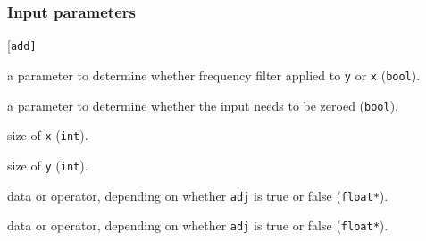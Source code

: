 \subsubsection*{Input parameters}
\begin{desclist}{\tt }{\quad}[\tt add]
   \setlength\itemsep{0pt}
   \item[adj] a parameter to determine whether frequency filter applied to \texttt{y} or \texttt{x} (\texttt{bool}).
   \item[add] a parameter to determine whether the input needs to be zeroed (\texttt{bool}).
   \item[nx]  size of \texttt{x} (\texttt{int}).
   \item[ny]  size of \texttt{y} (\texttt{int}).
   \item[x]   data or operator, depending on whether \texttt{adj} is true or false (\texttt{float*}).
   \item[y]   data or operator, depending on whether \texttt{adj} is true or false (\texttt{float*}).
\end{desclist}


